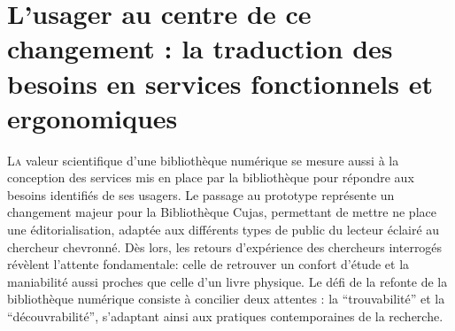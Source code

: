 \chapter[L'usage au centre du changement]{L'usager au centre de ce changement : la traduction des besoins en services fonctionnels et ergonomiques}

\lettrine{L}a valeur scientifique d'une bibliothèque numérique se mesure aussi à la conception des services mis en place par la bibliothèque pour répondre aux besoins identifiés de ses usagers. Le passage au prototype représente un changement majeur pour la Bibliothèque Cujas, permettant de mettre ne place une éditorialisation, adaptée aux différents types de public du lecteur éclairé au chercheur chevronné.
Dès lors, les retours d'expérience des chercheurs interrogés révèlent l'attente fondamentale: celle de retrouver un confort d'étude et la maniabilité aussi proches que celle d'un livre physique. Le défi de la refonte de la bibliothèque numérique consiste à concilier deux attentes : la \enquote{trouvabilité} et la \enquote{découvrabilité}, s'adaptant ainsi aux pratiques contemporaines de la recherche.



